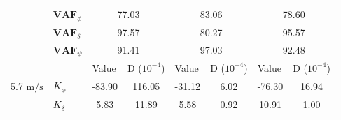 \begin{table}[]
\begin{tabular}{llcccccc}
                                 & $\mathbf{VAF}_\phi$   & \multicolumn{2}{c}{77.03}                                                                       & \multicolumn{2}{c}{83.06}                                                                       & \multicolumn{2}{c}{78.60}                                                                       \\
                                 & $\mathbf{VAF}_\delta$ & \multicolumn{2}{c}{97.57}                                                                       & \multicolumn{2}{c}{80.27}                                                                       & \multicolumn{2}{c}{95.57}                                                                       \\
                                 & $\mathbf{VAF}_\psi$   & \multicolumn{2}{c}{91.41}                                                                       & \multicolumn{2}{c}{97.03}                                                                       & \multicolumn{2}{c}{92.48}                                                                       \\ \hline
                                 &                       & \multicolumn{1}{l}{\multirow{2}{*}{Value}} & \multicolumn{1}{l}{\multirow{2}{*}{D ($10^{-4}$)}} & \multicolumn{1}{l}{\multirow{2}{*}{Value}} & \multicolumn{1}{l}{\multirow{2}{*}{D ($10^{-4}$)}} & \multicolumn{1}{l}{\multirow{2}{*}{Value}} & \multicolumn{1}{l}{\multirow{2}{*}{D ($10^{-4}$)}} \\
                                 &                       & \multicolumn{1}{l}{}                       & \multicolumn{1}{l}{}                               & \multicolumn{1}{l}{}                       & \multicolumn{1}{l}{}                               & \multicolumn{1}{l}{}                       & \multicolumn{1}{l}{}                               \\ \cline{3-8} 
    5.7 $\si{\meter\per\second}$ & $K_{\dot{\phi}} $     & -83.90                                     & 116.05                                             & -31.12                                     & 6.02                                               & -76.30                                     & 16.94                                              \\
                                 & $K_{\dot{\delta}}$    & 5.83                                       & 11.89                                              & 5.58                                       & 0.92                                               & 10.91                                      & 1.00                                               \\

\end{tabular}
\end{table}
